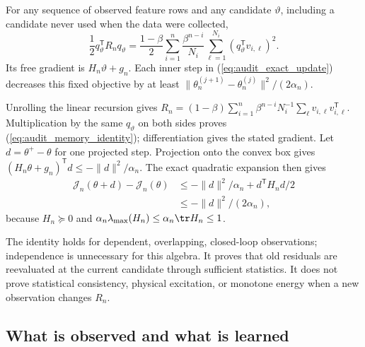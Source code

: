 \begin{auditproposition}
\label{prop:audit_memory}
For any sequence of observed feature rows and any candidate $\vartheta$,
including a candidate never used when the data were collected,
\begin{equation}
 \frac12q_\vartheta^{\mathsf T}R_nq_\vartheta
 =\frac{1-\beta}{2}\sum_{i=1}^{n}\frac{\beta^{n-i}}{N_i}
   \sum_{\ell=1}^{N_i}(q_\vartheta^{\mathsf T}v_{i,\ell})^2.
 \label{eq:audit_memory_identity}
\end{equation}
Its free gradient is $H_n\vartheta+g_n$. Each inner step in
(\ref{eq:audit_exact_update}) decreases this fixed objective by at least
$\|\theta_n^{(j+1)}-\theta_n^{(j)}\|^2/(2\alpha_n)$.
\end{auditproposition}
\begin{IEEEproof}
Unrolling the linear recursion gives
$R_n=(1-\beta)\sum_{i=1}^n\beta^{n-i}N_i^{-1}
\sum_\ell v_{i,\ell}v_{i,\ell}^{\mathsf T}$.
Multiplication by the same $q_\vartheta$ on both sides proves
(\ref{eq:audit_memory_identity}); differentiation gives the stated
gradient. Let $d=\theta^+-\theta$ for one projected step. Projection onto
the convex box gives $(H_n\theta+g_n)^{\mathsf T}d\le-\|d\|^2/\alpha_n$.
The exact quadratic expansion then gives
\begin{align*}
 \mathcal J_n(\theta+d)-\mathcal J_n(\theta)
 &\le-\|d\|^2/\alpha_n+d^{\mathsf T}H_nd/2\\
 &\le-\|d\|^2/(2\alpha_n),
\end{align*}
because $H_n\succeq0$ and
$\alpha_n\lambda_{\max}(H_n)\le\alpha_n\tr H_n\le1$.
\end{IEEEproof}
The identity holds for dependent, overlapping, closed-loop observations;
independence is unnecessary for this algebra. It proves that old residuals
are reevaluated at the current candidate through sufficient statistics.
It does not prove statistical consistency, physical excitation, or monotone
energy when a new observation changes $R_n$.

\subsection{What is observed and what is learned}
